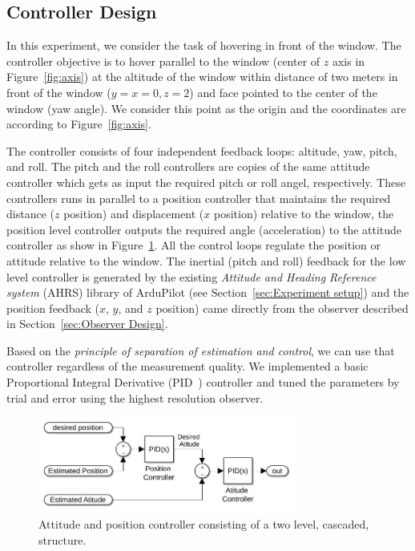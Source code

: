 \documentclass{sig-alternate-ipsn13}
\begin{document}
\subsection{Controller Design}

In this experiment, we consider the task of hovering in front of the window. The controller objective is to hover parallel to the window (center of $z$ axis in Figure~\ref{fig:axis}) at the altitude of the window within distance of two meters in front of the window ($y=x=0 , z=2$) and face pointed to the center of the window (yaw angle).
We consider this point as the origin and the coordinates are according to Figure~\ref{fig:axis}.

The controller consists of four independent feedback loops: altitude, yaw, pitch, and roll.
The pitch and the roll controllers are copies of the same attitude controller which gets as input the required pitch or roll angel, respectively. These controllers runs in parallel to a position controller that maintains the required distance ($z$ position) and displacement ($x$ position) relative to the window, the position level controller outputs the required angle (acceleration) to the attitude controller as show in Figure~\ref{fig:controllerStracture}.
All the control loops regulate the position or attitude relative to the window.
The inertial (pitch and roll) feedback for the low level controller is generated by the existing \textit{Attitude and Heading Reference system} (AHRS) library of ArduPilot (see Section~\ref{sec:Experiment setup}) and the position feedback ($x$, $y$, and $z$ position) came directly from the observer described in Section~\ref{sec:Observer Design}.

Based on the \textit{principle of separation of estimation and control}, we can use that controller regardless of the measurement quality. We implemented a basic Proportional Integral Derivative (PID~\cite{aastrom2006advanced}) controller and tuned the parameters by trial and error using the highest resolution observer.


\begin{figure}[htbp]
    \centerline{\includegraphics[width=85mm]{two_level_controller.jpg}}
    \caption{Attitude and position controller consisting of a two level, cascaded, structure.}
    \label{fig:controllerStracture}
\end{figure}
\end{document}
